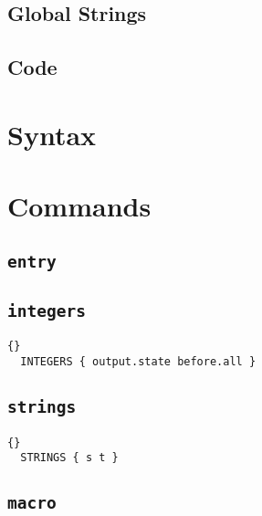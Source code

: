 \INCOMPLETE

\subsection{Global Strings}

\INCOMPLETE

\subsection{Code}

\INCOMPLETE


\section{Syntax}

\INCOMPLETE

\section{Commands}


\subsection{\texttt{entry}}

\INCOMPLETE

\subsection{\texttt{integers}}

\INCOMPLETE

\begin{lstlisting}{}
  INTEGERS { output.state before.all }
\end{lstlisting}

\subsection{\texttt{strings}}

\INCOMPLETE

\begin{lstlisting}{}
  STRINGS { s t }
\end{lstlisting}

\subsection{\texttt{macro}}

\INCOMPLETE


